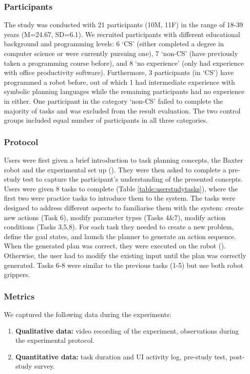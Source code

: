 \subsubsection{Participants}
The study was conducted with 21 participants (10M, 11F) in the range of 18-39 years (M=24.67, SD=6.1).
We recruited participants with different educational background and programming levels: 
6 `CS' (either completed a degree in computer science or were currently pursuing one),
7 `non-CS' (have previously taken a programming course before), 
and 8 `no experience' (only had experience with office productivity software).
Furthermore, 3 participants (in `CS') have programmed a robot before, out of which 1 had intermediate experience with symbolic planning languages while the remaining participants had no experience in either.
One participant in the category `non-CS' failed to complete the majority of tasks and was excluded from the result evaluation.
The two control groups included equal number of participants in all three categories.

\subsubsection{Protocol}
Users were first given a brief introduction to task planning concepts, the Baxter robot and the experimental set up ().
They were then asked to complete a pre-study test to capture the participant's understanding of the presented concepts.
Users were given 8 tasks to complete (Table \ref{table:userstudytasks}), where the first two were practice tasks to introduce them to the system. 
The tasks were designed to address different aspects to familiarise them with the system:
create new actions (Task 6), modify parameter types (Tasks 4\&7), modify action conditions (Tasks 3,5,8).
For each task they needed to create a new problem, define the goal states, and launch the planner to generate an action sequence.
When the generated plan was correct, they were executed on the robot ().
Otherwise, the user had to modify the existing input until the plan was correctly generated.
Tasks 6-8 were similar to the previous tasks (1-5) but use both robot grippers.

\subsubsection{Metrics}
We captured the following data during the experiments:
\begin{enumerate}
	\item \textbf{Qualitative data:} video recording of the experiment, observations during the experimental protocol.
	\item \textbf{Quantitative data:} task duration and UI activity log, pre-study test, post-study survey.
\end{enumerate}

